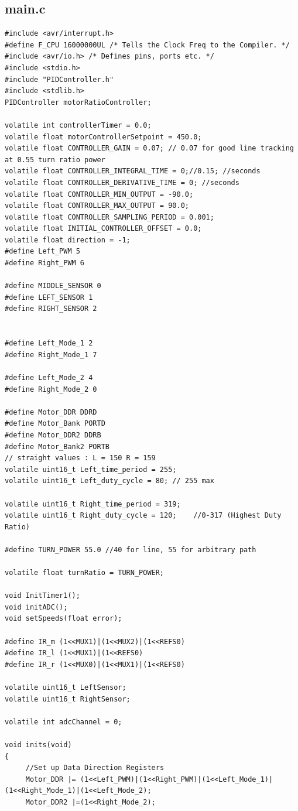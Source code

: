 \documentclass{article}
\begin{document}
\subsection{main.c}
\begin{lstlisting}
#include <avr/interrupt.h>
#define F_CPU 16000000UL /* Tells the Clock Freq to the Compiler. */
#include <avr/io.h> /* Defines pins, ports etc. */
#include <stdio.h>
#include "PIDController.h"
#include <stdlib.h>
PIDController motorRatioController;

volatile int controllerTimer = 0.0;
volatile float motorControllerSetpoint = 450.0;
volatile float CONTROLLER_GAIN = 0.07; // 0.07 for good line tracking at 0.55 turn ratio power
volatile float CONTROLLER_INTEGRAL_TIME = 0;//0.15; //seconds
volatile float CONTROLLER_DERIVATIVE_TIME = 0; //seconds
volatile float CONTROLLER_MIN_OUTPUT = -90.0;
volatile float CONTROLLER_MAX_OUTPUT = 90.0;
volatile float CONTROLLER_SAMPLING_PERIOD = 0.001;
volatile float INITIAL_CONTROLLER_OFFSET = 0.0;
volatile float direction = -1;
#define Left_PWM 5
#define Right_PWM 6

#define MIDDLE_SENSOR 0
#define LEFT_SENSOR 1
#define RIGHT_SENSOR 2


#define Left_Mode_1 2
#define Right_Mode_1 7

#define Left_Mode_2 4
#define Right_Mode_2 0

#define Motor_DDR DDRD
#define Motor_Bank PORTD
#define Motor_DDR2 DDRB
#define Motor_Bank2 PORTB
// straight values : L = 150 R = 159
volatile uint16_t Left_time_period = 255;
volatile uint16_t Left_duty_cycle = 80; // 255 max

volatile uint16_t Right_time_period = 319;
volatile uint16_t Right_duty_cycle = 120;    //0-317 (Highest Duty Ratio)

#define TURN_POWER 55.0 //40 for line, 55 for arbitrary path

volatile float turnRatio = TURN_POWER;

void InitTimer1();
void initADC();
void setSpeeds(float error);

#define IR_m (1<<MUX1)|(1<<MUX2)|(1<<REFS0)
#define IR_l (1<<MUX1)|(1<<REFS0)
#define IR_r (1<<MUX0)|(1<<MUX1)|(1<<REFS0)

volatile uint16_t LeftSensor;
volatile uint16_t RightSensor;

volatile int adcChannel = 0;

void inits(void)
{
   	 //Set up Data Direction Registers
   	 Motor_DDR |= (1<<Left_PWM)|(1<<Right_PWM)|(1<<Left_Mode_1)|(1<<Right_Mode_1)|(1<<Left_Mode_2);
   	 Motor_DDR2 |=(1<<Right_Mode_2);


\end{lstlisting}
\end{document}

